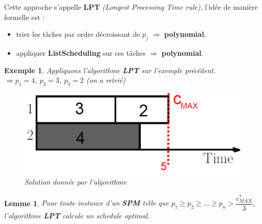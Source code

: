 \documentclass{article}
\newcommand{\titre}[1]{\textcolor{title}{#1}}
\newtheorem{exemple}{Exemple}[section]
\newtheorem{lemme}{Lemme}[section]
\begin{document}
\begin{sffamily}
Cette approche s'appelle \textbf{LPT} \textit{(Longest Processing Time rule)}, l'idée de manière formelle est :
\begin{itemize}
\item trier les tâches par ordre décroissant de $p_j$ $\Longrightarrow$ \textbf{polynomial},
\item appliquer \textbf{ListScheduling} sur ces tâches $\Longrightarrow$ \textbf{polynomial}.
\end{itemize}

\begin{exemple} Appliquons l'algorithme \textbf{LPT} sur l'exemple précédent.\\
$\Rightarrow p_1 = 4$, $p_2 = 3$, $p_3 = 2$ (on a retrié)
\begin{figure}[h!]
    \begin{center}
    \includegraphics[scale=0.3]{spm6.pdf}
    \caption{Solution donnée par l'algorithme}
    \end{center}	
\end{figure}
\end{exemple}

\begin{lemme}
Pour toute instance d'un \textbf{\titre{SPM}} telle que $p_1\geq p_2\geq \ldots \geq p_n > \dfrac{c^*_{MAX}}{3}$, l'algorithme \textbf{LPT} 
calcule un schedule optimal.
\end{lemme}

\newpage


\end{sffamily}
\end{document}

